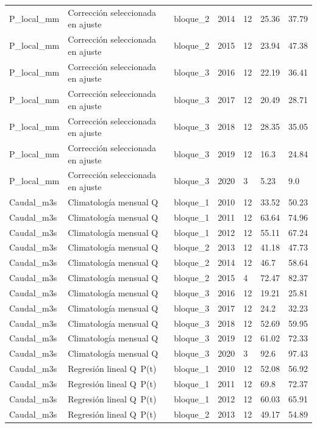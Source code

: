 \begin{longtable}{lllllll}
P\_local\_mm & Corrección seleccionada en ajuste & bloque\_2 & 2014 & 12 & 25.36 & 37.79 \\
P\_local\_mm & Corrección seleccionada en ajuste & bloque\_2 & 2015 & 12 & 23.94 & 47.38 \\
P\_local\_mm & Corrección seleccionada en ajuste & bloque\_3 & 2016 & 12 & 22.19 & 36.41 \\
P\_local\_mm & Corrección seleccionada en ajuste & bloque\_3 & 2017 & 12 & 20.49 & 28.71 \\
P\_local\_mm & Corrección seleccionada en ajuste & bloque\_3 & 2018 & 12 & 28.35 & 35.05 \\
P\_local\_mm & Corrección seleccionada en ajuste & bloque\_3 & 2019 & 12 & 16.3 & 24.84 \\
P\_local\_mm & Corrección seleccionada en ajuste & bloque\_3 & 2020 & 3 & 5.23 & 9.0 \\
Caudal\_m3s & Climatología mensual Q & bloque\_1 & 2010 & 12 & 33.52 & 50.23 \\
Caudal\_m3s & Climatología mensual Q & bloque\_1 & 2011 & 12 & 63.64 & 74.96 \\
Caudal\_m3s & Climatología mensual Q & bloque\_1 & 2012 & 12 & 55.11 & 67.24 \\
Caudal\_m3s & Climatología mensual Q & bloque\_2 & 2013 & 12 & 41.18 & 47.73 \\
Caudal\_m3s & Climatología mensual Q & bloque\_2 & 2014 & 12 & 46.7 & 58.64 \\
Caudal\_m3s & Climatología mensual Q & bloque\_2 & 2015 & 4 & 72.47 & 82.37 \\
Caudal\_m3s & Climatología mensual Q & bloque\_3 & 2016 & 12 & 19.21 & 25.81 \\
Caudal\_m3s & Climatología mensual Q & bloque\_3 & 2017 & 12 & 24.2 & 32.23 \\
Caudal\_m3s & Climatología mensual Q & bloque\_3 & 2018 & 12 & 52.69 & 59.95 \\
Caudal\_m3s & Climatología mensual Q & bloque\_3 & 2019 & 12 & 61.02 & 72.33 \\
Caudal\_m3s & Climatología mensual Q & bloque\_3 & 2020 & 3 & 92.6 & 97.43 \\
Caudal\_m3s & Regresión lineal Q~P(t) & bloque\_1 & 2010 & 12 & 52.08 & 56.92 \\
Caudal\_m3s & Regresión lineal Q~P(t) & bloque\_1 & 2011 & 12 & 69.8 & 72.37 \\
Caudal\_m3s & Regresión lineal Q~P(t) & bloque\_1 & 2012 & 12 & 60.03 & 65.91 \\
Caudal\_m3s & Regresión lineal Q~P(t) & bloque\_2 & 2013 & 12 & 49.17 & 54.89 \\

\end{longtable}

